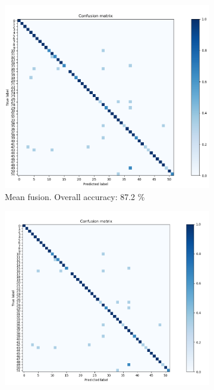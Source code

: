 \documentclass[10pt,technote]{IEEEtran}
\begin{document}
\begin{figure}
    \centering
    \begin{subfigure}[b]{0.3\textwidth}
        \includegraphics[width=\textwidth]{../results/ex2LDAEnsemble/conf_matrix_rand_mean.png}
        \caption{Mean fusion. Overall accuracy: 87.2 \% }
    \end{subfigure}    
    \begin{subfigure}[b]{0.3\textwidth}
        \includegraphics[width=\textwidth]{../results/ex2LDAEnsemble/conf_matrix_rand.png}

\end{subfigure}
\end{figure}
\end{document}
